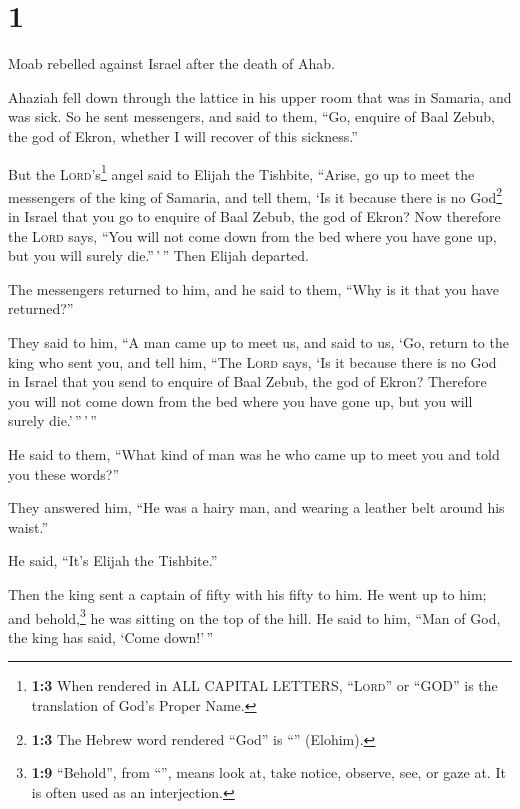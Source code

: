 \hypertarget{section}{%
\section{1}\label{section}}

 Moab rebelled against Israel after the death of Ahab.

 Ahaziah fell down through the lattice in his upper room
that was in Samaria, and was sick. So he sent messengers, and said to
them, ``Go, enquire of Baal Zebub, the god of Ekron, whether I will
recover of this sickness.''

 But the \textsc{Lord}'s\footnote{\textbf{1:3} When
  rendered in ALL CAPITAL LETTERS, ``\textsc{Lord}'' or ``GOD'' is the
  translation of God's Proper Name.} angel said to Elijah the Tishbite,
``Arise, go up to meet the messengers of the king of Samaria, and tell
them, `Is it because there is no God\footnote{\textbf{1:3} The Hebrew
  word rendered ``God'' is ``'' (Elohim).} in Israel that
you go to enquire of Baal Zebub, the god of Ekron?  Now
therefore the \textsc{Lord} says, ``You will not come down from the bed
where you have gone up, but you will surely die.''\,'\,'' Then Elijah
departed.

 The messengers returned to him, and he said to them,
``Why is it that you have returned?''

 They said to him, ``A man came up to meet us, and said to
us, `Go, return to the king who sent you, and tell him, ``The
\textsc{Lord} says, `Is it because there is no God in Israel that you
send to enquire of Baal Zebub, the god of Ekron? Therefore you will not
come down from the bed where you have gone up, but you will surely
die.'\,''\,'\,''

 He said to them, ``What kind of man was he who came up to
meet you and told you these words?''

 They answered him, ``He was a hairy man, and wearing a
leather belt around his waist.''

He said, ``It's Elijah the Tishbite.''

 Then the king sent a captain of fifty with his fifty to
him. He went up to him; and behold,\footnote{\textbf{1:9} ``Behold'',
  from ``'', means look at, take notice, observe, see, or
  gaze at. It is often used as an interjection.} he was sitting on the
top of the hill. He said to him, ``Man of God, the king has said, `Come
down!'\,''

